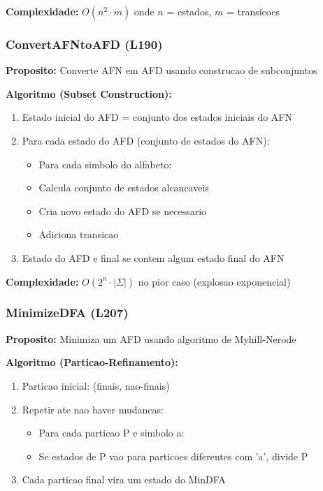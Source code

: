 \documentclass[12pt,a4paper]{article}
\begin{document}
\textbf{Complexidade:} $O(n^2 \cdot m)$ onde $n$ = estados, $m$ = transicoes

\subsubsection{ConvertAFNtoAFD (L190)}

\textbf{Proposito:} Converte AFN em AFD usando construcao de subconjuntos

\textbf{Algoritmo (Subset Construction):}
\begin{enumerate}
    \item Estado inicial do AFD = conjunto dos estados iniciais do AFN
    \item Para cada estado do AFD (conjunto de estados do AFN):
    \begin{itemize}
        \item Para cada simbolo do alfabeto:
        \item Calcula conjunto de estados alcancaveis
        \item Cria novo estado do AFD se necessario
        \item Adiciona transicao
    \end{itemize}
    \item Estado do AFD e final se contem algum estado final do AFN
\end{enumerate}

\textbf{Complexidade:} $O(2^n \cdot |\Sigma|)$ no pior caso (explosao exponencial)

\subsubsection{MinimizeDFA (L207)}

\textbf{Proposito:} Minimiza um AFD usando algoritmo de Myhill-Nerode

\textbf{Algoritmo (Particao-Refinamento):}
\begin{enumerate}
    \item Particao inicial: (finais, nao-finais)
    \item Repetir ate nao haver mudancas:
    \begin{itemize}
        \item Para cada particao P e simbolo a:
        \item Se estados de P vao para particoes diferentes com 'a', divide P
    \end{itemize}
    \item Cada particao final vira um estado do MinDFA
\end{enumerate}
\end{document}
